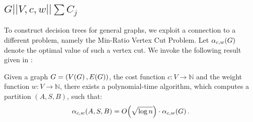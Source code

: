 \subsection{$G||V,c,w||\sum C_j$}\label{serachingInGs}
To construct decision trees for general graphs, we exploit a connection to a different problem, 
namely the Min-Ratio Vertex Cut Problem. 
Let $\alpha_{c,w}\mathopen{}\left( G \right)$ denote the optimal value of such a vertex cut. 
We invoke the following result given in \cite{Improvedapproximationalgorithmsvertexseparators}:

\begin{theorem}\label{approxmrvc}
    Given a graph $G=\mathopen{}\left( V\mathopen{}\left( G \right), E\mathopen{}\left( G \right) \right)$, the cost function $c:V\to\mathbb{N}$ and the weight function $w:V\to \mathbb{N}$, there exists a
polynomial-time algorithm, which computes a partition $(A, S, B)$, such that:
$$
\alpha_{c,w}\mathopen{}\left( A,S,B \right)=O\mathopen{}\left( \sqrt{\log n
} \right)\cdot\alpha_{c,w}\mathopen{}\left( G \right).
$$
\end{theorem}

